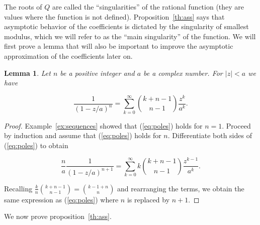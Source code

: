 \documentclass{article}
\newtheorem{lemma}{Lemma}
\begin{document}
The roots of $Q$ are called the ``singularities'' of the rational function
(they are values where the function is not defined).
Proposition~\ref{th:ass} says that asymptotic behavior of the coefficients
is dictated by the singularity of smallest modulus, which we will refer to
as the ``main singularity'' of the function.  We will first prove a lemma
that will also be important to improve the asymptotic approximation of the
coefficients later on.

\begin{lemma}
\label{lemma:poles}
Let $n$ be a positive integer and $a$ be a complex number. For $|z| < a$
we have

\begin{equation}
\label{eq:poles}
\frac{1}{(1-z/a)^n} = \sum_{k=0}^\infty {k+n-1 \choose n-1}\frac{z^k}{a^k}.
\end{equation}
\end{lemma}

\begin{proof}
Example~\ref{ex:sequences} showed that (\ref{eq:poles}) holds for $n=1$.
Proceed by induction and assume that (\ref{eq:poles}) holds for $n$.
Differentiate both sides of (\ref{eq:poles}) to obtain

\begin{equation*}
\frac{n}{a} \frac{1}{(1-z/a)^{n+1}} 
= \sum_{k=0}^\infty k {k+n-1 \choose n-1}\frac{z^{k-1}}{a^k}.
\end{equation*}

Recalling $\frac{k}{n}{k+n-1 \choose n-1} = {k-1+n \choose n}$ and
rearranging the terms, we obtain the same expression as (\ref{eq:poles})
where $n$ is replaced by $n+1$.
\end{proof}

We now prove proposition~\ref{th:ass}.
\end{document}
